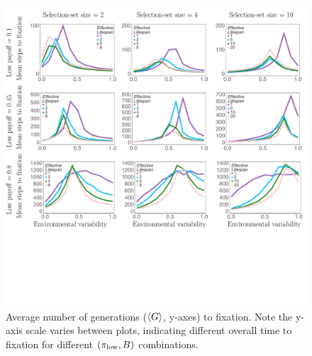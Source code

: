 \documentclass[letterpaper,11.5pt]{scrartcl}
\begin{document}
\begin{figure}
  \caption{Average number of generations ($\langle G \rangle$, y-axes) to fixation. 
    Note the y-axis scale varies between plots, indicating different overall 
    time to fixation for different $(\pi_{\mathrm{low}}, B)$ combinations.} 
  \label{fig:steps}
\centering
    \includegraphics[width=\textwidth]{Figures/stepResultsPlots.pdf}
\end{figure}
\end{document}
